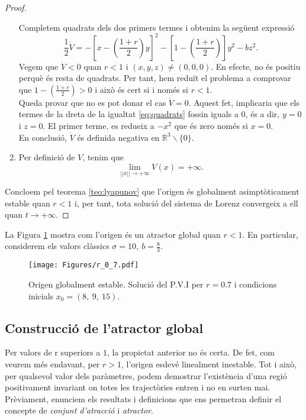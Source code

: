 \documentclass[11pt,a4paper,openright,oneside]{article}
\numberwithin{equation}{section}
\theoremstyle{definition}
\begin{document}
\begin{proof}
\begin{enumerate}
        Completem quadrats dels dos primers termes i obtenim la següent expressió 
        \begin{equation} \label{eq:quadrats}
            \frac{1}{2}\dot{V}=-\left[x-\left(\frac{1+r}{2}\right)y\right]^2-\left[1-\left(\frac{1+r}{2}\right)\right]y^{2}-bz^{2}.
        \end{equation}
        Vegem que $\dot{V}<0$ quan $r<1$ i $(x,y,z)\neq(0,0,0)$. En efecte, no és positiu perquè és resta de quadrats. Per tant, hem reduït el problema a comprovar que $1-\left(\frac{1+r}{2}\right)>0$ i això és cert si i només si $r<1$. \\Queda provar que no es pot donar el cas $\dot{V}=0$. Aquest fet, implicaria que els termes de la dreta de la igualtat \eqref{eq:quadrats} fossin iguals a 0, és a dir, $y=0$ i $z=0$. El primer terme, es redueix a $-x^{2}$ que és zero només si $x=0$. \\En conclusió, $\dot{V}$ és definida negativa en $\mathbb{R}^{3}\backslash\{0\}$.
        \item Per definició de $V$, tenim que \begin{equation*}
            \lim_{|| x || \to +\infty}V(x)=+\infty.
        \end{equation*}
    \end{enumerate}

    Concloem pel teorema \ref{teo:lyapunov} que l'origen és globalment asimptòticament estable quan $r<1$ i, per tant, tota solució del sistema de Lorenz convergeix a ell quan $t\rightarrow{+\infty}$.
\end{proof}

La Figura \ref{fig:r_0.7} mostra com l'origen és un atractor global quan $r<1$. En particular, considerem els valors clàssics $\sigma = 10, \ b=\frac{8}{3}$.

\begin{figure}[htpb]
    \centering
    \texttt{[image: Figures/r\_0\_7.pdf]}
    \caption{Origen globalment estable. Solució del P.V.I per $r=0.7$ i condicions inicials $x_0=(8, \ 9, \ 15)$.}
    \label{fig:r_0.7}
\end{figure}

\subsection*{Construcció de l'atractor global}

Per valors de r superiors a $1$, la propietat anterior no és certa. De fet, com veurem més endavant, per $r>1$, l'origen esdevé linealment inestable. Tot i això, per qualsevol valor dels paràmetres, podem demostrar l'existència d'una regió positivament invariant on totes les trajectòries entren i no en surten mai. Prèviament, enunciem els resultats i definicions que ens permetran definir el concepte de \textit{conjunt d'atracció} i \textit{atractor}.
\end{document}
